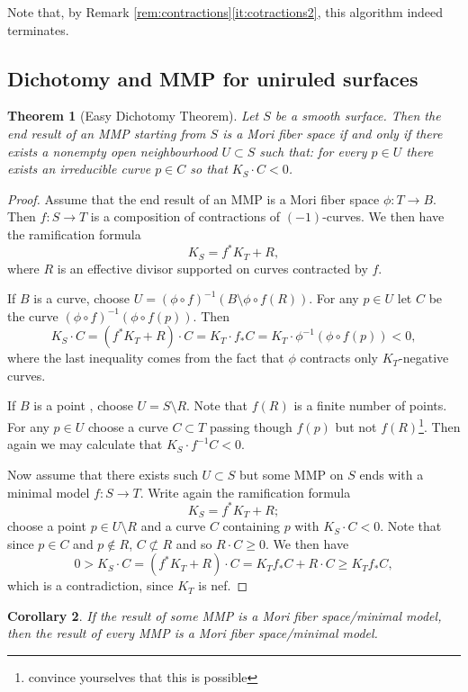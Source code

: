 \documentclass[a4paper,11pt]{amsart}
\newtheorem{theorem}{Theorem}[section]
\newtheorem{corollary}[theorem]{Corollary}
\begin{document}
Note that, by Remark \ref{rem:contractions}\eqref{it:cotractions2}, this algorithm indeed terminates.

\subsection{Dichotomy and MMP for uniruled surfaces}


\begin{theorem}[Easy Dichotomy Theorem]
	Let $S$ be a smooth surface.
	Then the end result of an MMP starting from $S$ is a Mori fiber space if and only if there exists a nonempty open neighbourhood $U\subset S$ such that: for every $p\in U$ there exists an irreducible curve $p\in C$ so that $K_S\cdot C <0$.
\end{theorem}

\begin{proof}
	Assume that the end result of an MMP is a Mori fiber space $\phi \colon T \to B$.
	Then $f\colon S \to T$ is a composition of contractions of $(-1)$-curves.
	We then have the ramification formula
	\[
	K_S = f^*K_T + R,
	\]
	where $R$ is an effective divisor supported on curves contracted by $f$.
	
	If $B$ is a curve, choose $U = (\phi\circ f)^{-1}(B \setminus \phi\circ f(R))$.
	For any $p \in U$ let $C$ be the curve $(\phi\circ f)^{-1}(\phi\circ f(p))$.
	Then
	\[
	K_S \cdot C = (f^*K_T + R)\cdot C = K_T\cdot f_*C = K_T \cdot \phi^{-1}(\phi\circ f(p)) < 0,
	\]
	where the last inequality comes from the fact that $\phi$ contracts only $K_T$-negative curves.
	
	If $B$ is a point , choose $U = S \setminus R$.
	Note that $f(R)$ is a finite number of points.
	For any $p \in U$ choose a curve $C \subset T$ passing though $f(p)$ but not $f(R)$\footnote{convince yourselves that this is possible}. 
	Then again we may calculate that $K_S \cdot f^{-1}C < 0$.
	
	Now assume that there exists such $U \subset S$ but some MMP on $S$ ends with a minimal model $f\colon S \to T$.
	Write again the ramification formula
	\[
	K_S = f^*K_T + R;
	\]
	choose a point $p \in U \setminus R$ and a curve $C$ containing $p$ with $K_S \cdot C < 0$.
	Note that since $p \in C$ and $p\not\in R$, $C \not\subset R$ and so $R \cdot C \geq 0$.
	We then have
	\[
	0>K_S\cdot C = (f^*K_T + R)\cdot C = K_Tf_*C + R\cdot C \geq  K_Tf_*C,
	\]
	which is a contradiction, since $K_T$ is nef.
\end{proof}

\begin{corollary}
	If the result of \emph{some} MMP is a Mori fiber space/minimal model, then the result of \emph{every} MMP is a Mori fiber space/minimal model.
\end{corollary}
\end{document}
